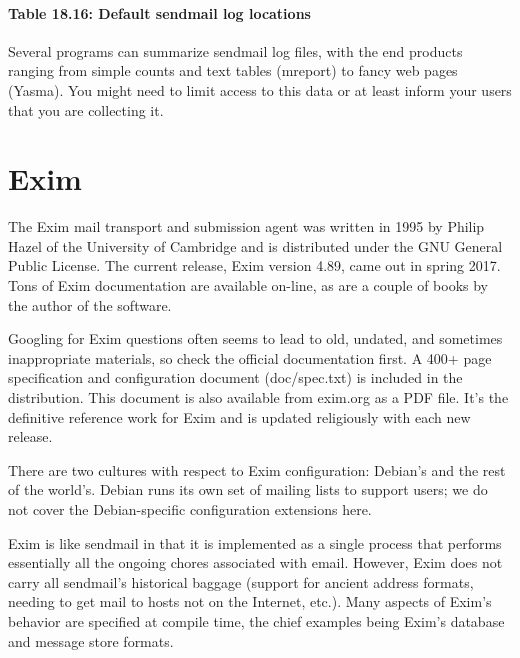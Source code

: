 \paragraph[{Table 18.16: }Default {sendmail} log
locations]{\texorpdfstring{{Table 18.16:
}\protect\hypertarget{part0026_split_039.htmlux5cux23_idTextAnchor1124}{}{}Default
{sendmail} log locations}{Table 18.16: Default sendmail log locations}}


Several programs can summarize {sendmail} log files, with the end
products ranging from simple counts and text tables ({mreport}) to fancy
web pages (Yasma). You might need to limit access to this data or at
least inform your users that you are collecting it.



\section{Exim}

\protect\hypertarget{part0026_split_040.htmlux5cux23_idIndexMarker2607}{}{}The
Exim mail transport and submission agent was written in 1995 by
\protect\hypertarget{part0026_split_040.htmlux5cux23_idIndexMarker2608}{}{}Philip
Hazel of the
\protect\hypertarget{part0026_split_040.htmlux5cux23_idIndexMarker2609}{}{}University
of Cambridge and is distributed under the GNU General Public License.
The current release, Exim version 4.89, came out in spring 2017. Tons of
Exim documentation are available on-line, as are a couple of books by
the author of the software.

Googling for Exim questions often seems to lead to old, undated, and
sometimes inappropriate materials, so check the official documentation
first. A 400+ page specification and configuration document
({doc/spec.txt}) is included in the distribution. This document is also
available from exim.org as a PDF file. It's the definitive reference
work for Exim and is updated religiously with each new release.

There are two cultures with respect to Exim configuration: Debian's and
the rest of the world's. Debian runs its own set of mailing lists to
support users; we do not cover the Debian-specific configuration
extensions here.

Exim is like {sendmail} in that it is implemented as a single process
that performs essentially all the ongoing chores associated with email.
However, Exim does not carry all {sendmail}'s historical baggage
(support for ancient address formats, needing to get mail to hosts not
on the Internet, etc.). Many aspects of Exim's behavior are specified at
compile time, the chief examples being Exim's database and message store
formats.

